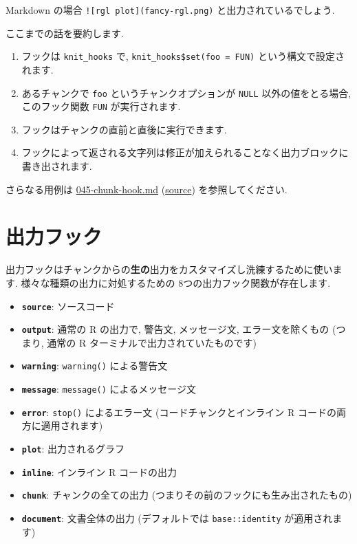 \documentclass[
  lualatex,ja=standard,jafont=noto-otf]{bxjsreport}
\providecommand{\tightlist}{%
  \setlength{\itemsep}{0pt}\setlength{\parskip}{0pt}}
\begin{document}
Markdown の場合 \texttt{!{[}rgl\ plot{]}(fancy-rgl.png)}
と出力されているでしょう.

ここまでの話を要約します.

\begin{enumerate}
\def\labelenumi{\arabic{enumi}.}
\tightlist
\item
  フックは \texttt{knit\_hooks} で,
  \texttt{knit\_hooks\$set(foo\ =\ FUN)} という構文で設定されます.
\item
  あるチャンクで \texttt{foo} というチャンクオプションが \texttt{NULL}
  以外の値をとる場合, このフック関数 \texttt{FUN} が実行されます.
\item
  フックはチャンクの直前と直後に実行できます.
\item
  フックによって返される文字列は修正が加えられることなく出力ブロックに書き出されます.
\end{enumerate}

さらなる用例は
\href{https://github.com/yihui/knitr-examples/blob/master/045-chunk-hook.md}{045-chunk-hook.md}
(\href{https://github.com/yihui/knitr-examples/blob/master/045-chunk-hook.Rmd}{source})
を参照してください.

\hypertarget{ux51faux529bux30d5ux30c3ux30af}{%
\section{出力フック}\label{ux51faux529bux30d5ux30c3ux30af}}

出力フックはチャンクからの\textbf{生の}出力をカスタマイズし洗練するために使います.
様々な種類の出力に対処するための 8つの出力フック関数が存在します.

\begin{itemize}
\tightlist
\item
  \textbf{\texttt{source}}: ソースコード
\item
  \textbf{\texttt{output}}: 通常の R の出力で, 警告文, メッセージ文,
  エラー文を除くもの (つまり, 通常の R
  ターミナルで出力されていたものです)
\item
  \textbf{\texttt{warning}}: \texttt{warning()} による警告文
\item
  \textbf{\texttt{message}}: \texttt{message()} によるメッセージ文
\item
  \textbf{\texttt{error}}: \texttt{stop()} によるエラー文
  (コードチャンクとインライン R コードの両方に適用されます)
\item
  \textbf{\texttt{plot}}: 出力されるグラフ
\item
  \textbf{\texttt{inline}}: インライン R コードの出力
\item
  \textbf{\texttt{chunk}}: チャンクの全ての出力
  (つまりその前のフックにも生み出されたもの)
\item
  \textbf{\texttt{document}}: 文書全体の出力 (デフォルトでは
  \texttt{base::identity} が適用されます)
\end{itemize}
\end{document}

